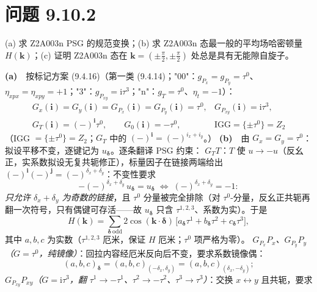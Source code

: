 \section*{问题 9.10.2}
\begin{problem}
(a) 求 Z2A003n PSG 的规范变换；(b) 求 Z2A003n 态最一般的平均场哈密顿量 $H(\pmb{k})$；(c) 证明 Z2A003n 态在 $\pmb{k}=(\pm\tfrac{\pi}{2},\pm\tfrac{\pi}{2})$ 处总是具有无能隙自旋子。
\end{problem}
\solution
\textbf{(a)}　按标记方案 (9.4.16)（第一类 (9.4.14)；"00"：$g_{P_x}=g_{P_y}=\tau^0$、$\eta_{xpx}=\eta_{xpy}=+1$；"3"：$g_{P_{xy}}=\mathrm{i}\tau^3$；"n"：$g_T=\tau^0$、$\eta_t=-1$）：
\begin{equation*}
\boxed{\;
\begin{array}{ll}
G_x(\pmb{i})=G_y(\pmb{i})=G_{P_x}(\pmb{i})=G_{P_y}(\pmb{i})=\tau^0, &
G_{P_{xy}}(\pmb{i})=\mathrm{i}\tau^3,\\[2pt]
G_T(\pmb{i})=(-)^{\pmb{i}}\tau^0,\qquad G_0(\pmb{i})=-\tau^0, &
\text{IGG}=\{\pm\tau^0\}=Z_2
\end{array}\;}
\end{equation*}
（IGG $=\{\pm\tau^0\}=Z_2$；$G_T$ 中的 $(-)^{\pmb{i}}=(-)^{i_x+i_y}$。）
\textbf{(b)}　由 $G_x=G_y=\tau^0$：拟设平移不变，逐键记为 $u_{\pmb{\delta}}$。逐条翻译 PSG 约束：
\emph{$G_TT$}：$T$ 使 $u\to-u$（反幺正，实系数拟设无复共轭修正），标量因子在链接两端给出 $(-)^{\pmb{i}}(-)^{\pmb{j}}=(-)^{\delta_x+\delta_y}$：不变性要求
\begin{equation*}
-( -)^{\delta_x+\delta_y}\,u_{\pmb{\delta}}=u_{\pmb{\delta}}
\;\Longleftrightarrow\;
(-)^{\delta_x+\delta_y}=-1 :
\end{equation*}
\emph{只允许 $\delta_x+\delta_y$ 为奇数的链接}，且 $\tau^{0}$ 分量被完全排除（对 $\tau^0$-分量，反幺正共轭再翻一次符号，只有偶键可存活——故 $u_{\pmb{\delta}}$ 只含 $\tau^{1,2,3}$、系数为实）。于是
\begin{equation*}
H(\pmb{k})=\sum_{\pmb{\delta}\ \mathrm{odd}}2\cos(\pmb{k}\cdot\pmb{\delta})\,
\big[a_{\pmb{\delta}}\tau^{1}+b_{\pmb{\delta}}\tau^{2}+c_{\pmb{\delta}}\tau^{3}\big] ,
\end{equation*}
其中 $a,b,c$ 为实数（$\tau^{1,2,3}$ 厄米，保证 $H$ 厄米；$\tau^0$ 项严格为零）。
\emph{$G_{P_x}P_x$、$G_{P_y}P_y$（$G=\tau^0$，纯镜像）}：回拉内容经厄米反向后不变，要求系数镜像偶：
\begin{equation*}
(a,b,c)_{\pmb{\delta}}=(a,b,c)_{(-\delta_x,\delta_y)}=(a,b,c)_{(\delta_x,-\delta_y)} ;
\end{equation*}
\emph{$G_{P_{xy}}P_{xy}$（$G=\mathrm{i}\tau^3$，翻 $\tau^{1}\to-\tau^{1}$、$\tau^{2}\to-\tau^{2}$、$\tau^{3}\to\tau^{3}$）}：交换 $x\leftrightarrow y$ 且共轭，要求
